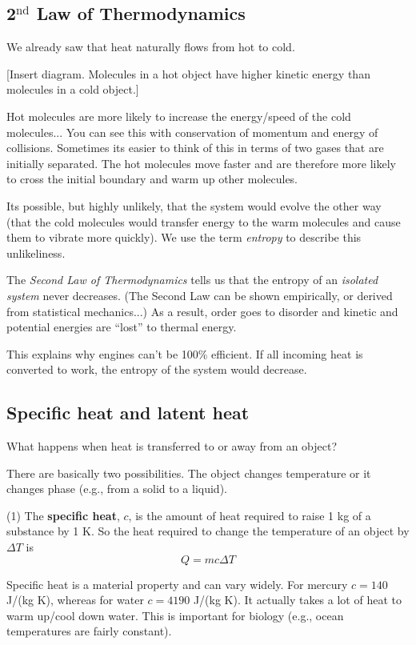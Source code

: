\subsection{2$^\mathrm{nd}$ Law of Thermodynamics}
We already saw that heat naturally flows from hot to cold.

[Insert diagram. Molecules in a hot object have higher kinetic energy than molecules in a cold object.]
\vspace{5cm}

Hot molecules are more likely to increase the energy/speed of the cold molecules... You can see this with conservation of momentum and energy of collisions. Sometimes its easier to think of this in terms of two gases that are initially separated. The hot molecules move faster and are therefore more likely to cross the initial boundary and warm up other molecules.

Its possible, but highly unlikely, that the system would evolve the other way (that the cold molecules would transfer energy to the warm molecules and cause them to vibrate more quickly). We use the term \textit{entropy} to describe this unlikeliness.

The \textit{Second Law of Thermodynamics} tells us that the entropy of an \textit{isolated system} never decreases. (The Second Law can be shown empirically, or derived from statistical mechanics...) As a result, order goes to disorder and kinetic and potential energies are ``lost'' to thermal energy.

This explains why engines can't be 100\% efficient. If all incoming heat is converted to work, the entropy of the system would decrease.

\subsection{Specific heat and latent heat}
What happens when heat is transferred to or away from an object?

There are basically two possibilities. The object changes temperature or it changes phase (e.g., from a solid to a liquid).

(1) The \textbf{specific heat}, $c$, is the amount of heat required to raise 1 kg of a substance by 1 K. So the heat required to change the temperature of an object by $\Delta{T}$ is
$$\boxed{Q=mc\Delta{T}}$$

Specific heat is a material property and can vary widely. For mercury $c=140$ J/(kg K), whereas for water $c=4190$ J/(kg K). It actually takes a lot of heat to warm up/cool down water. This is important for biology (e.g., ocean temperatures are fairly constant).

